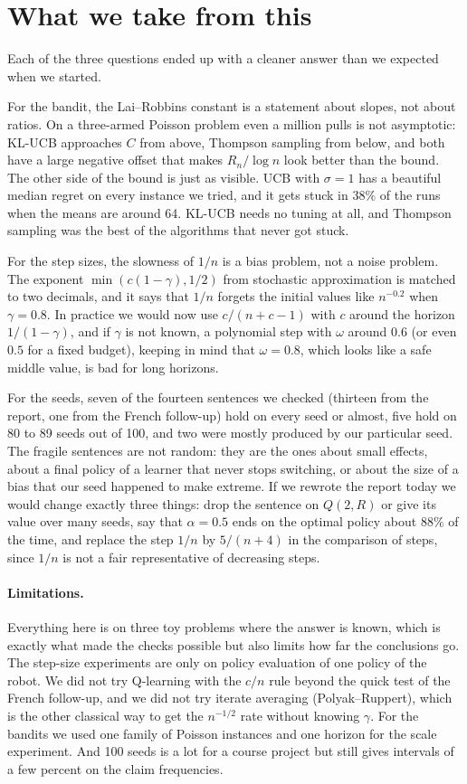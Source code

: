 \section{What we take from this}
\label{sec:discussion}

Each of the three questions ended up with a cleaner answer than we expected when we started.

For the bandit, the Lai--Robbins constant is a statement about slopes, not about ratios. On a three-armed Poisson problem even a million pulls is not asymptotic: KL-UCB approaches $C$ from above, Thompson sampling from below, and both have a large negative offset that makes $R_n/\log n$ look better than the bound. The other side of the bound is just as visible. UCB with $\sigma = 1$ has a beautiful median regret on every instance we tried, and it gets stuck in $38\%$ of the runs when the means are around 64. KL-UCB needs no tuning at all, and Thompson sampling was the best of the algorithms that never got stuck.

For the step sizes, the slowness of $1/n$ is a bias problem, not a noise problem. The exponent $\min(c(1-\gamma), 1/2)$ from stochastic approximation is matched to two decimals, and it says that $1/n$ forgets the initial values like $n^{-0.2}$ when $\gamma = 0.8$. In practice we would now use $c/(n+c-1)$ with $c$ around the horizon $1/(1-\gamma)$, and if $\gamma$ is not known, a polynomial step with $\omega$ around $0.6$ (or even $0.5$ for a fixed budget), keeping in mind that $\omega = 0.8$, which looks like a safe middle value, is bad for long horizons.

For the seeds, seven of the fourteen sentences we checked (thirteen from the report, one from the French follow-up) hold on every seed or almost, five hold on 80 to 89 seeds out of 100, and two were mostly produced by our particular seed. The fragile sentences are not random: they are the ones about small effects, about a final policy of a learner that never stops switching, or about the size of a bias that our seed happened to make extreme. If we rewrote the report today we would change exactly three things: drop the sentence on $Q(2, R)$ or give its value over many seeds, say that $\alpha = 0.5$ ends on the optimal policy about $88\%$ of the time, and replace the step $1/n$ by $5/(n+4)$ in the comparison of steps, since $1/n$ is not a fair representative of decreasing steps.

\paragraph{Limitations.} Everything here is on three toy problems where the answer is known, which is exactly what made the checks possible but also limits how far the conclusions go. The step-size experiments are only on policy evaluation of one policy of the robot. We did not try Q-learning with the $c/n$ rule beyond the quick test of the French follow-up, and we did not try iterate averaging (Polyak--Ruppert), which is the other classical way to get the $n^{-1/2}$ rate without knowing $\gamma$. For the bandits we used one family of Poisson instances and one horizon for the scale experiment. And 100 seeds is a lot for a course project but still gives intervals of a few percent on the claim frequencies.

